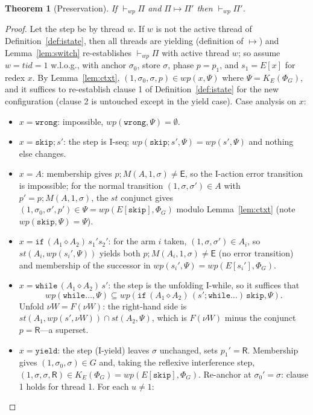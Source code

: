 \documentclass[11pt]{article}
\theoremstyle{plain}
\newtheorem{theorem}{Theorem}
\theoremstyle{plain}
\theoremstyle{definition}
\newcommand{\MR}{\mathsf{R}}
\newcommand{\ME}{\mathsf{E}}
\newcommand{\wpx}{\mathit{wp}}
\newcommand{\stp}{\mathit{st}}
\newcommand{\vdashwp}{\vdash_{\mathit{wp}}}
\newcommand{\tskip}{\mathtt{skip}}
\newcommand{\twrong}{\mathtt{wrong}}
\newcommand{\tyield}{\mathtt{yield}}
\newcommand{\kif}{\mathtt{if}}
\newcommand{\kwhile}{\mathtt{while}}
\newcommand{\cact}[2]{#1\diamond #2}                 %
\begin{document}
\begin{theorem}[Preservation]\label{thm:pres}
If $\vdashwp\Pi$ and $\Pi\mapsto\Pi'$ then $\vdashwp\Pi'$.
\end{theorem}
\begin{proof}
Let the step be by thread $w$. If $w$ is not the active thread of
Definition~\ref{def:istate}, then all threads are yielding (definition of
$\mapsto$) and Lemma~\ref{lem:switch} re-establishes $\vdashwp\Pi$ with active
thread $w$; so assume $w = \mathit{tid} = 1$ w.l.o.g., with anchor $\sigma_0$,
store $\sigma$, phase $p=p_1$, and $s_1 = E[x]$ for redex $x$. By
Lemma~\ref{lem:ctxt}, $(1,\sigma_0,\sigma,p)\in\wpx(x,\Psi)$ where
$\Psi = K_E(\Phi_G)$, and it suffices to re-establish clause 1 of
Definition~\ref{def:istate} for the new configuration (clause 2 is untouched except
in the yield case). Case analysis on $x$:
\begin{itemize}[leftmargin=1.4em]
\item $x=\twrong$: impossible, $\wpx(\twrong,\Psi)=\emptyset$.
\item $x=\tskip;s'$: the step is I-seq; $\wpx(\tskip;s',\Psi)=\wpx(s',\Psi)$ and
  nothing else changes.
\item $x=A$: membership gives $p;M(A,1,\sigma)\neq\ME$, so the I-action error
  transition is impossible; for the normal transition $(1,\sigma,\sigma')\in A$
  with $p' = p;M(A,1,\sigma)$, the $\stp$ conjunct gives
  $(1,\sigma_0,\sigma',p')\in\Psi = \wpx(E[\tskip],\Phi_G)$ modulo
  Lemma~\ref{lem:ctxt} (note $\wpx(\tskip,\Psi)=\Psi$).
\item $x=\kif\,(\cact{A_1}{A_2})\,s_1's_2'$: for the arm $i$ taken,
  $(1,\sigma,\sigma')\in A_i$, so $\stp(A_i,\wpx(s_i',\Psi))$ yields both
  $p;M(A_i,1,\sigma)\neq\ME$ (no error transition) and membership of the successor
  in $\wpx(s_i',\Psi) = \wpx(E[s_i'],\Phi_G)$.
\item $x=\kwhile\,(\cact{A_1}{A_2})\,s'$: the step is the unfolding I-while, so it
  suffices that
  \[
  \wpx(\kwhile\ldots,\Psi) \subseteq
  \wpx(\kif\,(\cact{A_1}{A_2})\,(s';\kwhile\ldots)\,\tskip,\Psi).
  \]
  Unfold $\nu W = F(\nu W)$: the right-hand side is
  $\stp(A_1,\wpx(s',\nu W))\cap\stp(A_2,\Psi)$, which is $F(\nu W)$ minus the
  conjunct $p=\MR$---a superset.
\item $x=\tyield$: the step (I-yield) leaves $\sigma$ unchanged, sets $p_1'=\MR$.
  Membership gives $(1,\sigma_0,\sigma)\in G$ and, taking the reflexive
  interference step, $(1,\sigma,\sigma,\MR)\in K_E(\Phi_G) = \wpx(E[\tskip],\Phi_G)$.
  Re-anchor at $\sigma_0' = \sigma$: clause 1 holds for thread 1. For each $u\neq 1$:

\end{itemize}
\end{proof}
\end{document}
